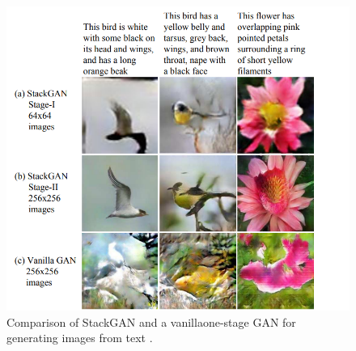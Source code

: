 \documentclass[12pt,twocolumn,a4paper]{article}
\begin{document}
        \begin{figure}[htp]
        \centering
        \includegraphics[scale=0.3]{birds.png}
        \caption{\centering Comparison of StackGAN and a vanillaone-stage GAN for generating images from text \cite{Zhang2016-pu}.}
        \label{fig:bb}
    \end{figure}
    
\end{document}

